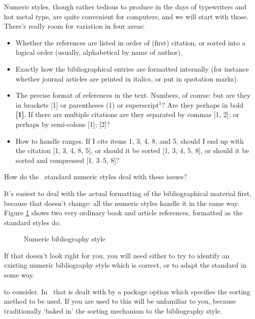 Numeric styles, though rather tedious to produce in the days of
typewriters and hot metal type, are quite convenient for computers,
and we will start with those. There's really room for variation in
four areas:
\begin{itemize}
\item Whether the references are listed in order of (first) citation,
  or sorted into a logical order (usually, alphabetical by name of
  author).
\item Exactly how the bibliographical entries are formatted internally
  (for instance whether journal articles are printed in italics, or
  put in quotation marks).
\item The precise format of references in the text. Numbers, of
  course: but are they in brackets [1] or parentheses (1) or
  superscript$^{1}$? Are they perhaps in bold \textbf{[1]}. If there
  are multiple citations are they separated by commas [1, 2]; or
  perhaps by semi-colons [1]; [2]?
\item How to handle ranges. If I cite items 1, 3, 4, 8, and 5, should
  I end up with the citation [1, 3, 4, 8, 5], or should it be sorted
  [1, 3, 4, 5, 8], or should it be sorted and compressed [1, 3--5, 8]?
\end{itemize}

How do the \biblatex\ standard numeric styles deal with these issues?

It's easiest to deal with the actual formatting of the bibliographical
material first, because that doesn't change: all the numeric styles handle it
in the same way. Figure \ref{numeric-examples} shows two very ordinary
book and article references, formatted as the standard styles do.

\begin{figure}
\caption{Numeric bibliography style\label{numeric-examples}}
\end{figure}

If that doesn't look right for you, you will need either to try to
identify an existing numeric bibliography style which is correct, or
to adapt the standard in some way.

 to consider. In \biblatex\ that
is dealt with by a package option which specifies the sorting method
to be used. If you are used to  this will be
unfamiliar to you, because traditionally  `baked in'
the sorting mechanism to the bibliography style.

